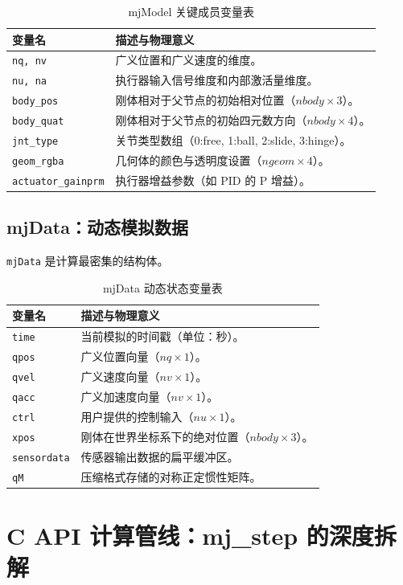 \documentclass[11pt,a4paper]{book}
\begin{document}
\begin{longtable}{lp{12cm}}
\caption{mjModel 关键成员变量表} \\
\toprule
\textbf{变量名} & \textbf{描述与物理意义} \\ \midrule
\texttt{nq, nv} & 广义位置和广义速度的维度。 \\
\texttt{nu, na} & 执行器输入信号维度和内部激活量维度。 \\
\texttt{body\_pos} & 刚体相对于父节点的初始相对位置（$nbody \times 3$）。 \\
\texttt{body\_quat} & 刚体相对于父节点的初始四元数方向（$nbody \times 4$）。 \\
\texttt{jnt\_type} & 关节类型数组（0:free, 1:ball, 2:slide, 3:hinge）。 \\
\texttt{geom\_rgba} & 几何体的颜色与透明度设置（$ngeom \times 4$）。 \\
\texttt{actuator\_gainprm} & 执行器增益参数（如 PID 的 P 增益）。 \\
\bottomrule
\end{longtable}

\subsection{mjData：动态模拟数据}
\texttt{mjData} 是计算最密集的结构体。

\begin{longtable}{lp{12cm}}
\caption{mjData 动态状态变量表} \\
\toprule
\textbf{变量名} & \textbf{描述与物理意义} \\ \midrule
\texttt{time} & 当前模拟的时间戳（单位：秒）。 \\
\texttt{qpos} & 广义位置向量（$nq \times 1$）。 \\
\texttt{qvel} & 广义速度向量（$nv \times 1$）。 \\
\texttt{qacc} & 广义加速度向量（$nv \times 1$）。 \\
\texttt{ctrl} & 用户提供的控制输入（$nu \times 1$）。 \\
\texttt{xpos} & 刚体在世界坐标系下的绝对位置（$nbody \times 3$）。 \\
\texttt{sensordata} & 传感器输出数据的扁平缓冲区。 \\
\texttt{qM} & 压缩格式存储的对称正定惯性矩阵。 \\
\bottomrule
\end{longtable}



\section{C API 计算管线：mj\_step 的深度拆解}
\end{document}
